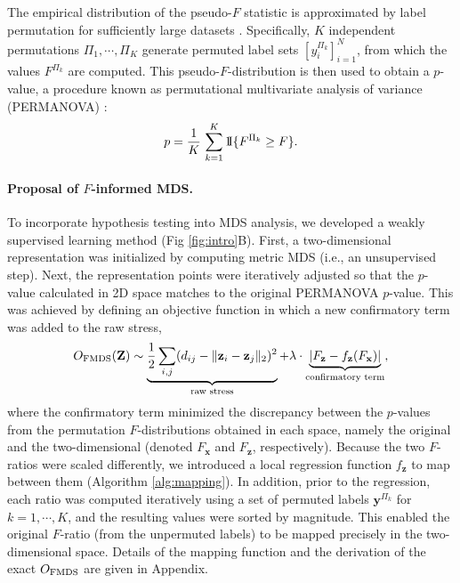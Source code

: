\documentclass[10pt,letterpaper]{article}
\newcommand{\1}{{\rm 1}\kern-0.24em{\rm I}}
\begin{document}
The empirical distribution of the pseudo-$F$ statistic is approximated by label permutation for sufficiently large datasets \cite{holmes96, gijbels13}.
Specifically, $K$ independent permutations $\Pi_1 , \cdots ,\Pi_K$ generate permuted label sets $[y_i^{\Pi_k}]_{i=1}^{N}$, from which the values $F^{\Pi_k}$ are computed. This pseudo-$F$-distribution is then used to obtain a $p$-value, a procedure known as permutational multivariate analysis of variance (PERMANOVA) \cite{anderson01}:
\begin{equation}
p = \frac{1}{K}\,\sum_{k=1}^{K}\1\{F^{\Pi_k}\geq F\}.
\end{equation}

\paragraph*{Proposal of $F$-informed MDS.}
To incorporate hypothesis testing into MDS analysis, we developed a weakly supervised learning method (Fig \ref{fig:intro}B).
First, a two-dimensional representation was initialized by computing metric MDS (i.e., an unsupervised step).
Next, the representation points were iteratively adjusted so that the $p$-value calculated in 2D space matches to the original PERMANOVA $p$-value.
This was achieved by defining an objective function in which a new confirmatory term was added to the raw stress,
\begin{equation} \label{eq:fmds}
    O_{\rm FMDS}(\mathbf{Z}) \sim
    \underbrace{\frac{1}{2}\sum_{i,j} (d_{ij} - \| \mathbf{z}_i - \mathbf{z}_j \|_2 )^2}_\text{raw stress} +
    \lambda\cdot \underbrace{\left|F_\mathbf{z} - f_\mathbf{z}(F_\mathbf{x})\right|}_\text{confirmatory term},
\end{equation}
where the confirmatory term minimized the discrepancy between the $p$-values from the permutation $F$-distributions obtained in each space, namely the original and the two-dimensional (denoted $F_\mathbf{x}$ and $F_\mathbf{z}$, respectively).
Because the two $F$-ratios were scaled differently, we introduced a local regression function $f_\mathbf{z}$ to map between them (Algorithm \ref{alg:mapping}). In addition, prior to the regression, each ratio was computed iteratively using a set of permuted labels $\mathbf{y}^{\Pi_k}$ for $k=1, \cdots, K$, and the resulting values were sorted by magnitude. This enabled the original $F$-ratio (from the unpermuted labels) to be mapped precisely in the two-dimensional space.
Details of the mapping function and the derivation of the exact $O_{\rm FMDS}$ are given in  Appendix.
\end{document}

